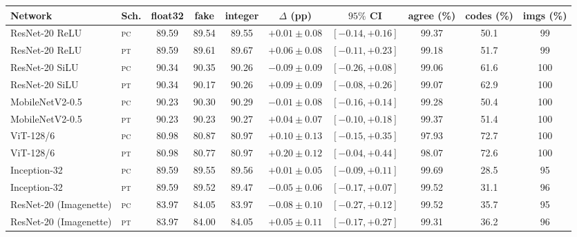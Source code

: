 \begin{tabular}{llcccccccc}
\toprule
Network & Sch. & float32 & fake & integer & $\Delta$ (pp) & $95\%$ CI & agree (\%) & codes (\%) & imgs (\%) \\
\midrule
ResNet-20 ReLU & \textsc{pc} & 89.59 & 89.54 & 89.55 & $+0.01\pm0.08$ & $[-0.14,+0.16]$ & 99.37 & 50.1 & 99 \\
ResNet-20 ReLU & \textsc{pt} & 89.59 & 89.61 & 89.67 & $+0.06\pm0.08$ & $[-0.11,+0.23]$ & 99.18 & 51.7 & 99 \\
ResNet-20 SiLU & \textsc{pc} & 90.34 & 90.35 & 90.26 & $-0.09\pm0.09$ & $[-0.26,+0.08]$ & 99.06 & 61.6 & 100 \\
ResNet-20 SiLU & \textsc{pt} & 90.34 & 90.17 & 90.26 & $+0.09\pm0.09$ & $[-0.08,+0.26]$ & 99.07 & 62.9 & 100 \\
MobileNetV2-0.5 & \textsc{pc} & 90.23 & 90.30 & 90.29 & $-0.01\pm0.08$ & $[-0.16,+0.14]$ & 99.28 & 50.4 & 100 \\
MobileNetV2-0.5 & \textsc{pt} & 90.23 & 90.23 & 90.27 & $+0.04\pm0.07$ & $[-0.10,+0.18]$ & 99.37 & 51.4 & 100 \\
ViT-128/6 & \textsc{pc} & 80.98 & 80.87 & 80.97 & $+0.10\pm0.13$ & $[-0.15,+0.35]$ & 97.93 & 72.7 & 100 \\
ViT-128/6 & \textsc{pt} & 80.98 & 80.77 & 80.97 & $+0.20\pm0.12$ & $[-0.04,+0.44]$ & 98.07 & 72.6 & 100 \\
Inception-32 & \textsc{pc} & 89.59 & 89.55 & 89.56 & $+0.01\pm0.05$ & $[-0.09,+0.11]$ & 99.69 & 28.5 & 95 \\
Inception-32 & \textsc{pt} & 89.59 & 89.52 & 89.47 & $-0.05\pm0.06$ & $[-0.17,+0.07]$ & 99.52 & 31.1 & 96 \\
ResNet-20 (Imagenette) & \textsc{pc} & 83.97 & 84.05 & 83.97 & $-0.08\pm0.10$ & $[-0.27,+0.12]$ & 99.52 & 35.7 & 95 \\
ResNet-20 (Imagenette) & \textsc{pt} & 83.97 & 84.00 & 84.05 & $+0.05\pm0.11$ & $[-0.17,+0.27]$ & 99.31 & 36.2 & 96 \\
\bottomrule
\end{tabular}
